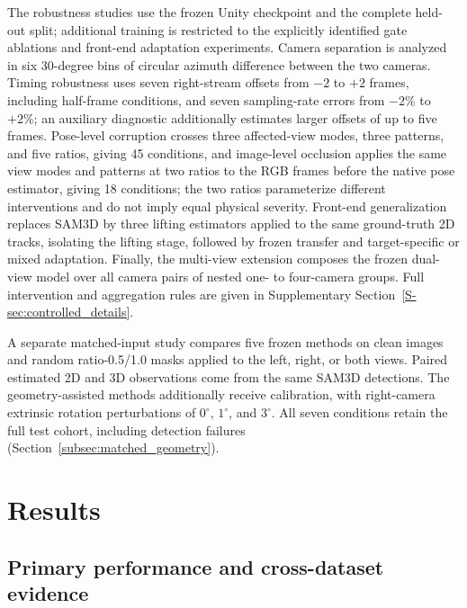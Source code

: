 \documentclass[preprint,12pt]{elsarticle}
\begin{document}
The robustness studies use the frozen Unity checkpoint and the complete held-out split; additional training is restricted to the explicitly identified gate ablations and front-end adaptation experiments. Camera separation is analyzed in six 30-degree bins of circular azimuth difference between the two cameras. Timing robustness uses seven right-stream offsets from \(-2\) to \(+2\) frames, including half-frame conditions, and seven sampling-rate errors from \(-2\%\) to \(+2\%\); an auxiliary diagnostic additionally estimates larger offsets of up to five frames. Pose-level corruption crosses three affected-view modes, three patterns, and five ratios, giving 45 conditions, and image-level occlusion applies the same view modes and patterns at two ratios to the RGB frames before the native pose estimator, giving 18 conditions; the two ratios parameterize different interventions and do not imply equal physical severity. Front-end generalization replaces SAM3D by three lifting estimators applied to the same ground-truth 2D tracks, isolating the lifting stage, followed by frozen transfer and target-specific or mixed adaptation. Finally, the multi-view extension composes the frozen dual-view model over all camera pairs of nested one- to four-camera groups. Full intervention and aggregation rules are given in Supplementary Section~\ref{S-sec:controlled_details}.

A separate matched-input study compares five frozen methods on clean images and random ratio-0.5/1.0 masks applied to the left, right, or both views. Paired estimated 2D and 3D observations come from the same SAM3D detections. The geometry-assisted methods additionally receive calibration, with right-camera extrinsic rotation perturbations of $0^\circ$, $1^\circ$, and $3^\circ$. All seven conditions retain the full test cohort, including detection failures (Section~\ref{subsec:matched_geometry}).

\section{Results}
\label{sec:results}

\subsection{Primary performance and cross-dataset evidence}
\end{document}
